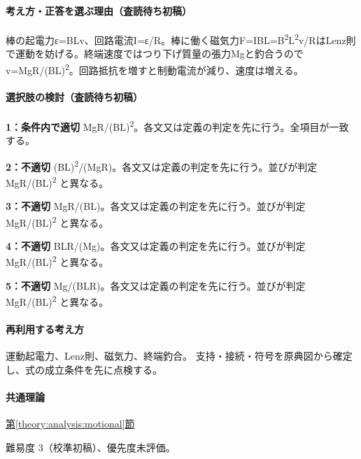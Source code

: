 \paragraph{考え方・正答を選ぶ理由（査読待ち初稿）} 棒の起電力ε=BLv、回路電流I=ε/R。棒に働く磁気力F=\allowbreak{}IBL=\allowbreak{}B\textsuperscript{2}L\textsuperscript{2}v/RはLenz則で運動を妨げる。終端速度ではつり下げ質量の張力Mgと釣合うのでv=\allowbreak{}MgR/(BL)\textsuperscript{2}。回路抵抗を増すと制動電流が減り、速度は増える。

\paragraph{選択肢の検討（査読待ち初稿）}\mbox{}\par

\noindent\textbf{1：条件内で適切} MgR/(BL)\textsuperscript{2}。各文又は定義の判定を先に行う。全項目が一致する。\par

\noindent\textbf{2：不適切} (BL)\textsuperscript{2}/(MgR)。各文又は定義の判定を先に行う。並びが判定 MgR/(BL)\textsuperscript{2} と異なる。\par

\noindent\textbf{3：不適切} MgR/(BL)。各文又は定義の判定を先に行う。並びが判定 MgR/(BL)\textsuperscript{2} と異なる。\par

\noindent\textbf{4：不適切} BLR/(Mg)。各文又は定義の判定を先に行う。並びが判定 MgR/(BL)\textsuperscript{2} と異なる。\par

\noindent\textbf{5：不適切} Mg/(BLR)。各文又は定義の判定を先に行う。並びが判定 MgR/(BL)\textsuperscript{2} と異なる。\par

\paragraph{再利用する考え方} 運動起電力、Lenz則、磁気力、終端釣合。 支持・接続・符号を原典図から確定し、式の成立条件を先に点検する。

\paragraph{共通理論} \hyperref[theory:analysis:motional]{第\ref*{theory:analysis:motional}節}

\par 難易度 3（校準初稿）、優先度未評価。

